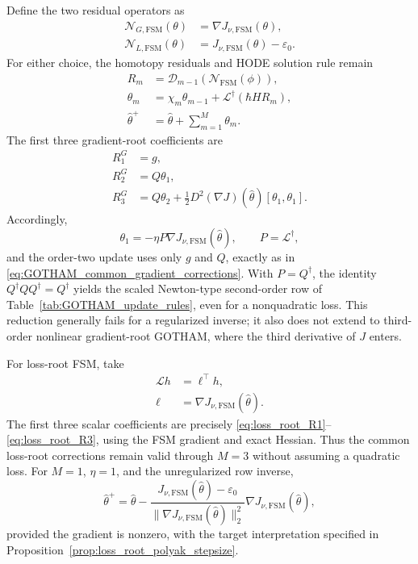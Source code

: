 Define the two residual operators as
\begin{align}
\label{eq:FSM_gradient_root_operator}
    \mathcal N_{G,\mathrm{FSM}}(\theta)&=\nabla J_{\nu,\mathrm{FSM}}(\theta),\\
\label{eq:FSM_loss_root_operator}
    \mathcal N_{L,\mathrm{FSM}}(\theta)&=J_{\nu,\mathrm{FSM}}(\theta)-\varepsilon_0.
\end{align}
For either choice, the homotopy residuals and HODE solution rule remain
\begin{align}
\label{eq:FSM_residual_coefficients}
    R_m&=\mathscr D_{m-1}(\mathcal N_{\mathrm{FSM}}(\phi)),\\
\label{eq:FSM_GOTHAM_update}
    \theta_m&=\chi_m\theta_{m-1}
       +\mathcal L^\dagger(\hbar H R_m),\\
\label{eq:FSM_GOTHAM_parameter_update}
    \hat\theta^+&=\hat\theta+\sum_{m=1}^{M}\theta_m.
\end{align}
The first three gradient-root coefficients are
\begin{equation}
\label{eq:FSM_gradient_first_residuals}
\begin{aligned}
    R_1^G&=g,\\
    R_2^G&=Q\theta_1,\\
    R_3^G&=Q\theta_2+
       \tfrac12D^2(\nabla J)(\hat\theta)[\theta_1,\theta_1].
\end{aligned}
\end{equation}
Accordingly,
\begin{equation}
\label{eq:FSM_first_order_gradient_root}
    \theta_1=-\eta P\nabla J_{\nu,\mathrm{FSM}}(\hat\theta),
    \qquad P=\mathcal L^\dagger,
\end{equation}
and the order-two update uses only $g$ and $Q$, exactly as in
\eqref{eq:GOTHAM_common_gradient_corrections}. With $P=Q^\dagger$,
the identity $Q^\dagger QQ^\dagger=Q^\dagger$ yields the scaled
Newton-type second-order row of Table~\ref{tab:GOTHAM_update_rules},
even for a nonquadratic loss. This reduction generally fails for a
regularized inverse; it also does not extend to third-order nonlinear
gradient-root GOTHAM, where the third derivative of $J$ enters.

For loss-root FSM, take
\begin{align}
\label{eq:FSM_loss_root_aux_operator}
    \mathcal Lh&=\ell^\top h,\\
\label{eq:FSM_loss_root_direction}
    \ell&=\nabla J_{\nu,\mathrm{FSM}}(\hat\theta).
\end{align}
The first three scalar coefficients are precisely
\eqref{eq:loss_root_R1}--\eqref{eq:loss_root_R3}, using the FSM
gradient and exact Hessian. Thus the common loss-root corrections
remain valid through $M=3$ without assuming a quadratic loss.
For $M=1$, $\eta=1$, and the unregularized row inverse,
\begin{equation}
\label{eq:FSM_loss_root_polyak_update}
    \hat\theta^+=\hat\theta-
    \frac{J_{\nu,\mathrm{FSM}}(\hat\theta)-\varepsilon_0}
         {\|\nabla J_{\nu,\mathrm{FSM}}(\hat\theta)\|_2^2}
    \nabla J_{\nu,\mathrm{FSM}}(\hat\theta),
\end{equation}
provided the gradient is nonzero, with the target interpretation
specified in Proposition~\ref{prop:loss_root_polyak_stepsize}.

